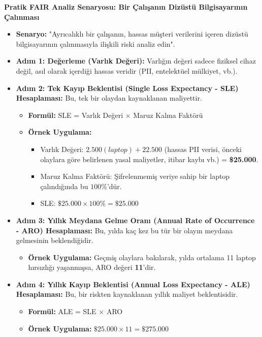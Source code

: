 \textbf{Pratik FAIR Analiz Senaryosu: Bir Çalışanın Dizüstü Bilgisayarının Çalınması}

\begin{itemize}
    \item \textbf{Senaryo:} "Ayrıcalıklı bir çalışanın, hassas müşteri verilerini içeren dizüstü bilgisayarının çalınmasıyla ilişkili riski analiz edin".
    \item \textbf{Adım 1: Değerleme (Varlık Değeri):} Varlığın değeri sadece fiziksel cihaz değil, asıl olarak içerdiği hassas veridir (PII, entelektüel mülkiyet, vb.).
    \item \textbf{Adım 2: Tek Kayıp Beklentisi (Single Loss Expectancy - SLE) Hesaplaması:} Bu, tek bir olaydan kaynaklanan maliyettir.
    \begin{itemize}
        \item \textbf{Formül:} SLE = Varlık Değeri $\times$ Maruz Kalma Faktörü
        \item \textbf{Örnek Uygulama:}
        \begin{itemize}
            \item Varlık Değeri: $2.500 (laptop) + 22.500$ (hassas PII verisi, önceki olaylara göre belirlenen yasal maliyetler, itibar kaybı vb.) = \textbf{\$25.000}.
            \item Maruz Kalma Faktörü: Şifrelenmemiş veriye sahip bir laptop çalındığında bu $100\%$'dür.
            \item SLE: $\$25.000 \times 100\% = \$25.000$
        \end{itemize}
    \end{itemize}
    \item \textbf{Adım 3: Yıllık Meydana Gelme Oranı (Annual Rate of Occurrence - ARO) Hesaplaması:} Bu, yılda kaç kez bu tür bir olayın meydana gelmesinin beklendiğidir.
    \begin{itemize}
        \item \textbf{Örnek Uygulama:} Geçmiş olaylara bakılarak, yılda ortalama 11 laptop hırsızlığı yaşanmışsa, ARO değeri \textbf{11}'dir.
    \end{itemize}
    \item \textbf{Adım 4: Yıllık Kayıp Beklentisi (Annual Loss Expectancy - ALE) Hesaplaması:} Bu, bir riskten kaynaklanan yıllık maliyet beklentisidir.
    \begin{itemize}
        \item \textbf{Formül:} ALE = SLE $\times$ ARO
        \item \textbf{Örnek Uygulama:} $\$25.000 \times 11 = \$275.000$
    \end{itemize}
\end{itemize}

